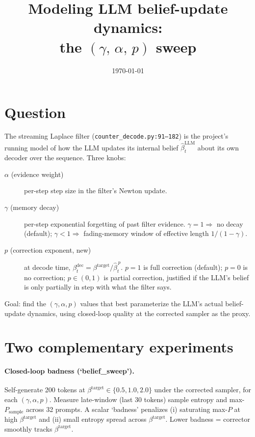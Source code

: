 \documentclass[11pt]{article}
\title{Modeling LLM belief-update dynamics:\\
the $(\gamma,\,\alpha,\,p)$ sweep}
\author{}
\date{\today}
\begin{document}
\maketitle

\section{Question}

The streaming Laplace filter (\texttt{counter\_decode.py:91--182}) is the
project's running model of how the LLM updates its internal belief
$\hat\beta^{\mathrm{LLM}}_t$ about its own decoder over the sequence. Three
knobs:
\begin{description}
\item[$\alpha$ (evidence weight)] per-step step size in the filter's
Newton update.
\item[$\gamma$ (memory decay)] per-step exponential forgetting of past
filter evidence. $\gamma = 1 \Rightarrow$ no decay (default); $\gamma < 1
\Rightarrow$ fading-memory window of effective length $1/(1-\gamma)$.
\item[$p$ (correction exponent, new)] at decode time,
$\beta^{\mathrm{dec}}_t = \beta^{\mathrm{target}} / \hat\beta_t^{\,p}$.
$p = 1$ is full correction (default); $p = 0$ is no correction;
$p \in (0, 1)$ is partial correction, justified if the LLM's belief is
only partially in step with what the filter says.
\end{description}

Goal: find the $(\gamma, \alpha, p)$ values that best parameterize the
LLM's actual belief-update dynamics, using closed-loop quality at the
corrected sampler as the proxy.

\section{Two complementary experiments}

\paragraph{Closed-loop badness (`belief\_sweep').}
Self-generate 200 tokens at $\beta^{\mathrm{target}} \in \{0.5, 1.0, 2.0\}$
under the corrected sampler, for each $(\gamma, \alpha, p)$. Measure
late-window (last 30 tokens) sample entropy and max-$P_{\text{sample}}$
across 32 prompts. A scalar `badness' penalizes (i) saturating max-$P$
at high $\beta^{\mathrm{target}}$ and (ii) small entropy spread across
$\beta^{\mathrm{target}}$. Lower badness = corrector smoothly tracks
$\beta^{\mathrm{target}}$.
\end{document}
